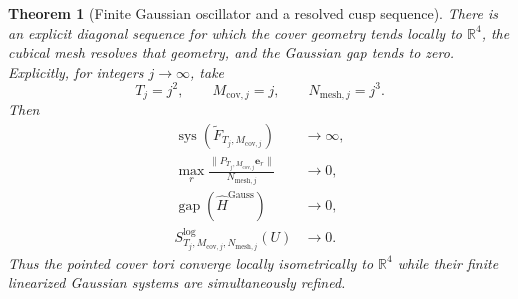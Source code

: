 \documentclass[11pt]{article}
\newtheorem{theorem}{Theorem}[section]
\theoremstyle{definition}
\numberwithin{equation}{section}
\begin{document}
\begin{theorem}[Finite Gaussian oscillator and a resolved cusp sequence]
There is an explicit diagonal sequence for which the cover geometry tends locally to
\(\mathbb R^4\), the cubical mesh resolves that geometry, and the Gaussian
gap tends to zero.  Explicitly, for integers \(j\to\infty\), take
\begin{equation}
 T_j=j^2,\qquad M_{\mathrm{cov},j}=j,\qquad
 N_{\mathrm{mesh},j}=j^3.
 \label{cusp-link-diagonal-sequence}
\end{equation}
Then
\begin{equation}
 \begin{aligned}
 \operatorname{sys}(\widetilde F_{T_j,M_{\mathrm{cov},j}})
 &\longrightarrow\infty,\\
 \max_r
 \frac{\lVert P_{T_j,M_{\mathrm{cov},j}}\mathbf e_r\rVert}
      {N_{\mathrm{mesh},j}}
 &\longrightarrow0,\\
 \operatorname{gap}(\widehat H^{\mathrm{Gauss}})
 &\longrightarrow0,\\
 S^{\log}_{T_j,M_{\mathrm{cov},j},N_{\mathrm{mesh},j}}(U)
 &\longrightarrow0.
 \end{aligned}
 \label{cusp-link-diagonal-conclusions}
\end{equation}
Thus the pointed cover tori converge locally isometrically to \(\mathbb R^4\)
while their finite linearized Gaussian systems are simultaneously refined.
\end{theorem}
\end{document}
